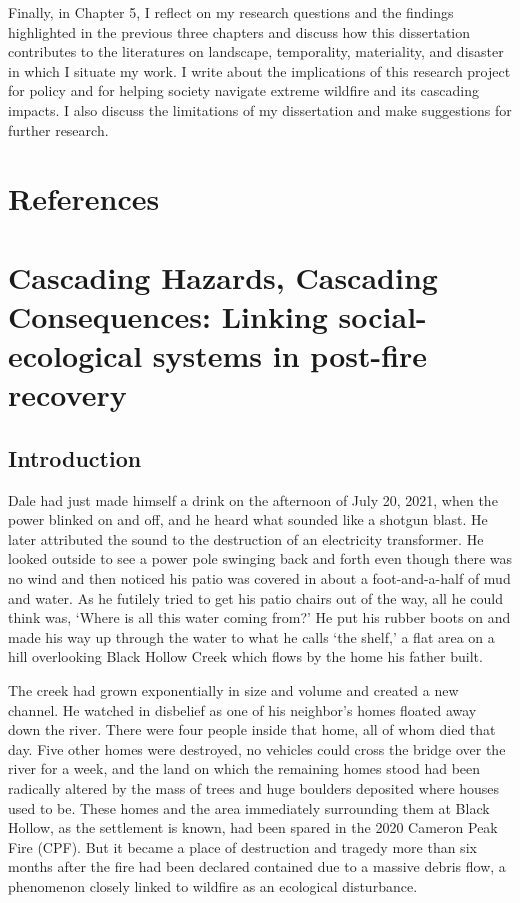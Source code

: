 \documentclass[
]{article}
\begin{document}
Finally, in Chapter 5, I reflect on my research questions and the findings highlighted in the previous three chapters and discuss how this dissertation contributes to the literatures on landscape, temporality, materiality, and disaster in which I situate my work. I write about the implications of this research project for policy and for helping society navigate extreme wildfire and its cascading impacts. I also discuss the limitations of my dissertation and make suggestions for further research.

\section{References}\label{references}

\clearpage

\section{Cascading Hazards, Cascading Consequences: Linking social-ecological systems in post-fire recovery}\label{cascading-hazards-cascading-consequences-linking-social-ecological-systems-in-post-fire-recovery}

\renewcommand{\thefigure}{2.\arabic{figure}}
\setcounter{figure}{0}
\renewcommand{\thetable}{2.\arabic{table}}
\setcounter{table}{0}
\renewcommand{\theequation}{2.\arabic{equation}}
\setcounter{equation}{0}

\subsection{Introduction}\label{introduction-1}

Dale had just made himself a drink on the afternoon of July 20, 2021, when the power blinked on and off, and he heard what sounded like a shotgun blast. He later attributed the sound to the destruction of an electricity transformer. He looked outside to see a power pole swinging back and forth even though there was no wind and then noticed his patio was covered in about a foot-and-a-half of mud and water. As he futilely tried to get his patio chairs out of the way, all he could think was, `Where is all this water coming from?' He put his rubber boots on and made his way up through the water to what he calls `the shelf,' a flat area on a hill overlooking Black Hollow Creek which flows by the home his father built.

The creek had grown exponentially in size and volume and created a new channel. He watched in disbelief as one of his neighbor's homes floated away down the river. There were four people inside that home, all of whom died that day. Five other homes were destroyed, no vehicles could cross the bridge over the river for a week, and the land on which the remaining homes stood had been radically altered by the mass of trees and huge boulders deposited where houses used to be. These homes and the area immediately surrounding them at Black Hollow, as the settlement is known, had been spared in the 2020 Cameron Peak Fire (CPF). But it became a place of destruction and tragedy more than six months after the fire had been declared contained due to a massive debris flow, a phenomenon closely linked to wildfire as an ecological disturbance.
\end{document}
